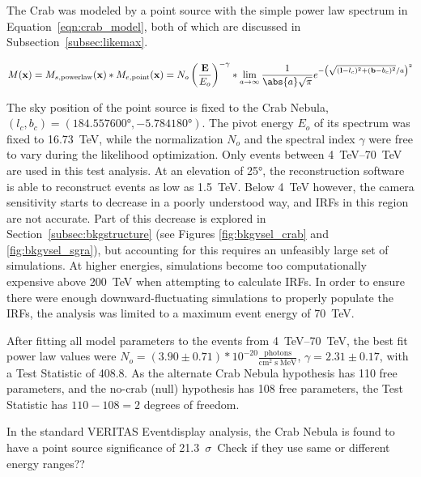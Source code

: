   The Crab was modeled by a point source with the simple power law spectrum in Equation~\ref{eqn:crab_model}, both of which are discussed in Subsection~\ref{subsec:likemax}.

  \begin{equation}\label{eqn:crab_model}
    M(\xtrue) = M_{s,\textrm{powerlaw}}(\xtrue) * M_{e,\textrm{point}}(\xtrue) = N_o \left ( \frac{\Etrue}{E_o} \right )^{-\gamma} * \lim_{a\to\infty} \frac{1}{ \abs{a} \sqrt{\pi} } e^{ - \left ( \sqrt{ (\ltrue-l_c)^2 + (\btrue-b_c)^2 }/a \right )^2 }
  \end{equation}

  The sky position of the point source is fixed to the Crab Nebula, $(l_c,b_c) = (\ang{184.557600},\ang{-5.784180})$.
  The pivot energy $E_o$ of its spectrum was fixed to \SI{16.73}{TeV}, while the normalization $N_o$ and the spectral index $\gamma$ were free to vary during the likelihood optimization.
  Only events between \SIrange{4}{70}{TeV} are used in this test analysis.
  At an elevation of \ang{25}, the reconstruction software is able to reconstruct events as low as \SI{1.5}{TeV}.
  Below \SI{4}{TeV} however, the camera sensitivity starts to decrease in a poorly understood way, and IRFs in this region are not accurate.
  Part of this decrease is explored in Section~\ref{subsec:bkgstructure} (see Figures \ref{fig:bkgvsel_crab} and \ref{fig:bkgvsel_sgra}), but accounting for this requires an unfeasibly large set of simulations.
  At higher energies, simulations become too computationally expensive above \SI{200}{TeV} when attempting to calculate IRFs.
  In order to ensure there were enough downward-fluctuating simulations to properly populate the IRFs, the analysis was limited to a maximum event energy of \SI{70}{TeV}.
    
  After fitting all model parameters to the events from \SIrange{4}{70}{TeV}, the best fit power law values were $ N_o = \left(3.90\pm0.71\right)*10^{-20} \frac{\textrm{photons}}{\textrm{cm}^{2} \; \textrm{s} \; \textrm{MeV} } $, $ \gamma = 2.31 \pm 0.17 $, with a Test Statistic of 408.8.
  As the alternate Crab Nebula hypothesis has 110 free parameters, and the no-crab (null) hypothesis has 108 free parameters, the Test Statistic has $ 110 - 108 = 2 $ degrees of freedom.
  
  In the standard VERITAS Eventdisplay analysis, the Crab Nebula is found to have a point source significance of \SI{21.3}{$\sigma$}.
  {\color{red}Check if they use same or different energy ranges??}
    
